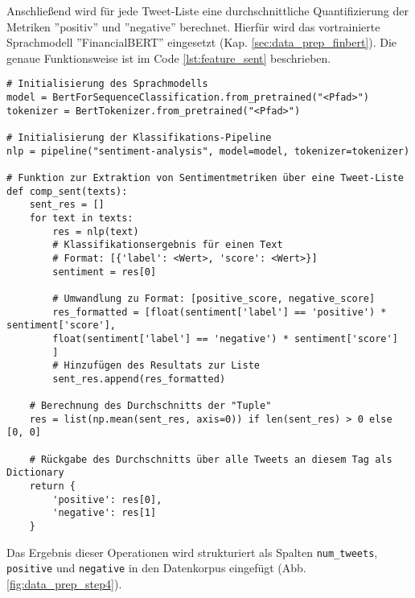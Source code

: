 Anschließend wird für jede Tweet-Liste eine durchschnittliche Quantifizierung der Metriken ''positiv'' und ''negative'' berechnet. Hierfür wird das vortrainierte Sprachmodell ''FinancialBERT'' eingesetzt (Kap. \ref{sec:data_prep_finbert}). Die genaue Funktionsweise ist im Code \ref{lst:feature_sent} beschrieben.
\begin{lstlisting}[caption={Stimmung quantifiziert als Positiv/Negativ-Score}, label=lst:feature_sent, captionpos=t]
# Initialisierung des Sprachmodells
model = BertForSequenceClassification.from_pretrained("<Pfad>")
tokenizer = BertTokenizer.from_pretrained("<Pfad>")

# Initialisierung der Klassifikations-Pipeline
nlp = pipeline("sentiment-analysis", model=model, tokenizer=tokenizer)

# Funktion zur Extraktion von Sentimentmetriken über eine Tweet-Liste
def comp_sent(texts):
	sent_res = []
	for text in texts:
		res = nlp(text)
		# Klassifikationsergebnis für einen Text
		# Format: [{'label': <Wert>, 'score': <Wert>}]
		sentiment = res[0]
		
		# Umwandlung zu Format: [positive_score, negative_score]
		res_formatted = [float(sentiment['label'] == 'positive') * sentiment['score'], 
		float(sentiment['label'] == 'negative') * sentiment['score']
		]
		# Hinzufügen des Resultats zur Liste
		sent_res.append(res_formatted)

	# Berechnung des Durchschnitts der "Tuple"
	res = list(np.mean(sent_res, axis=0)) if len(sent_res) > 0 else [0, 0]

	# Rückgabe des Durchschnitts über alle Tweets an diesem Tag als Dictionary
	return {
		'positive': res[0],
		'negative': res[1]
	}
\end{lstlisting}
Das Ergebnis dieser Operationen wird strukturiert als Spalten \texttt{num\_tweets}, \texttt{positive} und \texttt{negative} in den Datenkorpus eingefügt (Abb. \ref{fig:data_prep_step4}).


